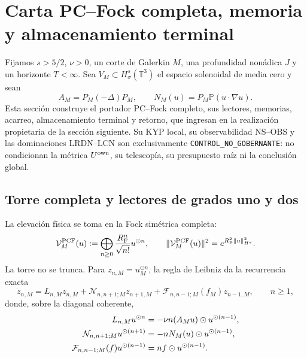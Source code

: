 \section{Carta PC--Fock completa, memoria y almacenamiento terminal}
\label{sec:ns-pcf-prospective-construction}

Fijamos \(s>5/2\), \(\nu>0\), un corte de Galerkin \(M\), una profundidad
nonádica \(J\) y un horizonte \(T<\infty\). Sea
\(V_M\subset H^s_\sigma(\mathbb T^3)\) el espacio solenoidal de media cero y
sean
\begin{equation}
 A_M=P_M(-\Delta)P_M,
 \qquad
 N_M(u)=P_M\mathbb P(u\cdot\nabla u).
 \label{eq:ns-import-galerkin-operators}
\end{equation}
Esta sección construye el portador PC--Fock completo, sus lectores, memorias,
acarreo, almacenamiento terminal y retorno, que ingresan en la realización
propietaria de la sección siguiente. Su KYP local, su observabilidad NS--OBS y
las dominaciones LRDN--LCN son exclusivamente
\texttt{CONTROL\_NO\_GOBERNANTE}: no condicionan la métrica
\(U^{\rm own}\), su telescopía, su presupuesto raíz ni la conclusión global.

\subsection{Torre completa y lectores de grados uno y dos}

La elevación física se toma en la Fock simétrica completa:
\begin{equation}
 \mathcal V_M^{\rm PCF}(u)
 :=\bigoplus_{n\ge0}\frac{R_{\rm F}^n}{\sqrt{n!}}u^{\odot n},
 \qquad
 \|\mathcal V_M^{\rm PCF}(u)\|^2
 =e^{R_{\rm F}^2\|u\|_{H^s}^2}.
 \label{eq:ns-import-pcf-lift}
\end{equation}
La torre no se trunca. Para \(z_{n,M}=u_M^{\odot n}\), la regla de Leibniz
da la recurrencia exacta
\begin{equation}
 \dot z_{n,M}
 =L_{n,M}z_{n,M}
 +\mathcal N_{n,n+1;M}z_{n+1,M}
 +\mathcal F_{n,n-1;M}(f_M)z_{n-1,M},
 \qquad n\ge1,
 \label{eq:ns-import-carleman-all-degrees}
\end{equation}
donde, sobre la diagonal coherente,
\begin{align}
 L_{n,M}u^{\odot n}
 &=-\nu n(A_Mu)\odot u^{\odot(n-1)}, \notag\\
 \mathcal N_{n,n+1;M}u^{\odot(n+1)}
 &=-nN_M(u)\odot u^{\odot(n-1)}, \notag\\
 \mathcal F_{n,n-1;M}(f)u^{\odot(n-1)}
 &=nf\odot u^{\odot(n-1)}.
 \label{eq:ns-import-carleman-blocks}
\end{align}

